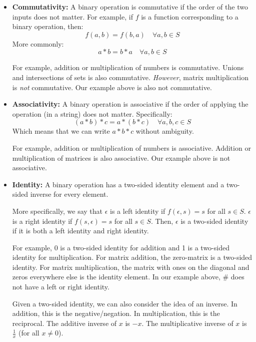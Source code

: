 \documentclass[letterpaper]{article}
\begin{document}
\begin{itemize}
    \item \textbf{Commutativity:} A binary operation is commutative if the order of the two inputs does not matter. For example, if $f$ is a function corresponding to a binary operation, then:
    \[f(a, b) = f(b, a) \quad \forall a, b \in S\] 
    More commonly:
    \[a * b = b * a \quad \forall a, b \in S\]

    For example, addition or multiplication of numbers is commutative. Unions and intersections of sets is also commutative. \emph{However}, matrix multiplication is \emph{not} commutative. Our example above is also not commutative. 

    \item \textbf{Associativity:} A binary operation is associative if the order of applying the operation (in a string) does not matter. Specifically:
    \[(a * b) * c = a * (b * c) \quad \forall a, b, c \in S\]
    Which means that we can write $a * b * c$ without ambiguity.
    
    \bigskip 

    For example, addition or multiplication of numbers is associative. Addition or multiplication of matrices is also associative. Our example above is not associative. 

    \item \textbf{Identity:} A binary operation has a two-sided identity element and a two-sided inverse for every element. 
    
    \bigskip 
    
    More specifically, we say that $\epsilon$ is a left identity if $f(\epsilon, s) = s$ for all $s \in S$. $\epsilon$ is a right identity if $f(s, \epsilon) = s$ for all $s \in S$. Then, $\epsilon$ is a two-sided identity if it is both a left identity and right identity.  
    
    \bigskip 

    For example, 0 is a two-sided identity for addition and 1 is a two-sided identity for multiplication. For matrix addition, the zero-matrix is a two-sided identity. For matrix multiplication, the matrix with ones on the diagonal and zeros everywhere else is the identity element. In our example above, $\#$ does not have a left or right identity. 

    \bigskip 

    Given a two-sided identity, we can also consider the idea of an inverse. In addition, this is the negative/negation. In multiplication, this is the reciprocal. The additive inverse of $x$ is $-x$. The multiplicative inverse of $x$ is $\frac{1}{x}$ (for all $x \neq 0$). 
    

\end{itemize}
\end{document}

